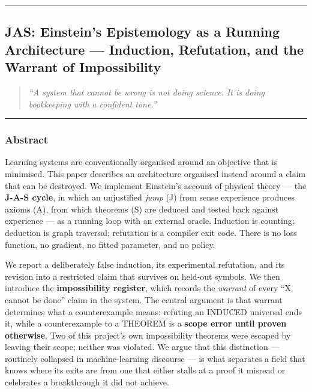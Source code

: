 \documentclass[
  11pt,
  a4paper,
]{article}
\begin{document}
\begin{center}\rule{0.5\linewidth}{0.5pt}\end{center}

\newpage

\subsection{JAS: Einstein's Epistemology as a Running Architecture ---
Induction, Refutation, and the Warrant of
Impossibility}\label{jas-einsteins-epistemology-as-a-running-architecture-induction-refutation-and-the-warrant-of-impossibility}

\begin{quote}
\emph{``A system that cannot be wrong is not doing science. It is doing
bookkeeping with a confident tone.''}
\end{quote}

\begin{center}\rule{0.5\linewidth}{0.5pt}\end{center}

\subsubsection{Abstract}\label{abstract}

Learning systems are conventionally organised around an objective that
is minimised. This paper describes an architecture organised instead
around a claim that can be destroyed. We implement Einstein's account of
physical theory --- the \textbf{J-A-S cycle}, in which an unjustified
\emph{jump} (J) from sense experience produces axioms (A), from which
theorems (S) are deduced and tested back against experience --- as a
running loop with an external oracle. Induction is counting; deduction
is graph traversal; refutation is a compiler exit code. There is no loss
function, no gradient, no fitted parameter, and no policy.

We report a deliberately false induction, its experimental refutation,
and its revision into a restricted claim that survives on held-out
symbols. We then introduce the \textbf{impossibility register}, which
records the \emph{warrant} of every ``X cannot be done'' claim in the
system. The central argument is that warrant determines what a
counterexample means: refuting an INDUCED universal ends it, while a
counterexample to a THEOREM is a \textbf{scope error until proven
otherwise}. Two of this project's own impossibility theorems were
escaped by leaving their scope; neither was violated. We argue that this
distinction --- routinely collapsed in machine-learning discourse --- is
what separates a field that knows where its exits are from one that
either stalls at a proof it misread or celebrates a breakthrough it did
not achieve.
\end{document}
